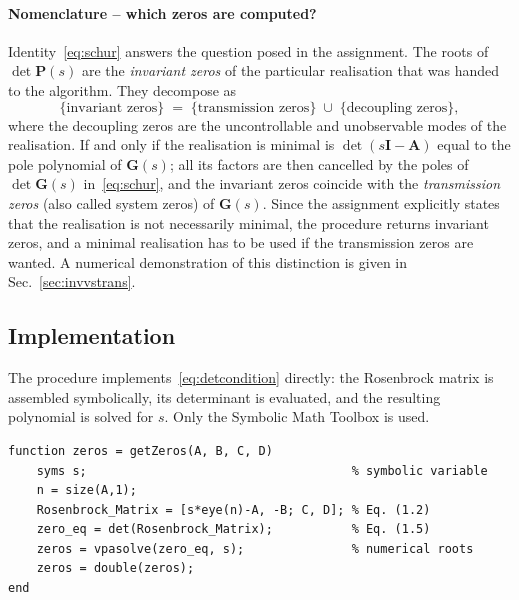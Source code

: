 \paragraph{Nomenclature -- which zeros are computed?} Identity~\eqref{eq:schur} answers the
question posed in the assignment. The roots of $\det\mathbf{P}(s)$ are the \emph{invariant
zeros} of the particular realisation that was handed to the algorithm. They decompose as
\begin{equation}
    \{\text{invariant zeros}\} \;=\;
    \{\text{transmission zeros}\} \;\cup\; \{\text{decoupling zeros}\},
    \label{eq:zerodecomposition}
\end{equation}
where the decoupling zeros are the uncontrollable and unobservable modes of the realisation. If
and only if the realisation is minimal is $\det(s\mathbf{I}-\mathbf{A})$ equal to the pole
polynomial of $\mathbf{G}(s)$; all its factors are then cancelled by the poles of
$\det\mathbf{G}(s)$ in~\eqref{eq:schur}, and the invariant zeros coincide with the
\emph{transmission zeros} (also called system zeros) of $\mathbf{G}(s)$. Since the assignment
explicitly states that the realisation is not necessarily minimal, the procedure returns
invariant zeros, and a minimal realisation has to be used if the transmission zeros are wanted.
A numerical demonstration of this distinction is given in Sec.~\ref{sec:invvstrans}.

\subsection{Implementation}

The procedure implements~\eqref{eq:detcondition} directly: the Rosenbrock matrix is assembled
symbolically, its determinant is evaluated, and the resulting polynomial is solved for $s$. Only
the Symbolic Math Toolbox is used.

\begin{lstlisting}[caption={\texttt{getZeros.m} -- invariant zeros of a square system},captionpos=b]
function zeros = getZeros(A, B, C, D)
    syms s;                                     % symbolic variable
    n = size(A,1);
    Rosenbrock_Matrix = [s*eye(n)-A, -B; C, D]; % Eq. (1.2)
    zero_eq = det(Rosenbrock_Matrix);           % Eq. (1.5)
    zeros = vpasolve(zero_eq, s);               % numerical roots
    zeros = double(zeros);
end
\end{lstlisting}


